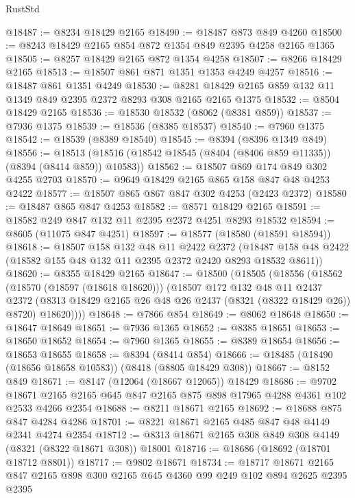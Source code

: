 \begin{lexlean}{RustStd}
\begin{coremodule}
@18487 := @8234 @18429 @2165
@18490 := @18487 @873 @849 @4260
@18500 := @8243 @18429 @2165 @854 @872 @1354 @849 @2395 @4258 @2165 @1365
@18505 := @8257 @18429 @2165 @872 @1354 @4258
@18507 := @8266 @18429 @2165
@18513 := @18507 @861 @871 @1351 @1353 @4249 @4257
@18516 := @18487 @861 @1351 @4249
@18530 := @8281 @18429 @2165 @859 @132 @11 @1349 @849 @2395 @2372 @8293 @308 @2165 @2165 @1375
@18532 := @8504 @18429 @2165
@18536 := @18530 @18532 (@8062 (@8381 @859))
@18537 := @7936 @1375
@18539 := @18536 (@8385 @18537)
@18540 := @7960 @1375
@18542 := @18539 (@8389 @18540)
@18545 := @8394 (@8396 @1349 @849)
@18556 := @18513 (@18516 (@18542 @18545 (@8404 (@8406 @859 @11335)) (@8394 (@8414 @859)) @10583))
@18562 := @18507 @869 @174 @849 @302 @4255 @2703
@18570 := @9649 @18429 @2165 @865 @158 @847 @48 @4253 @2422
@18577 := @18507 @865 @867 @847 @302 @4253 (@2423 @2372)
@18580 := @18487 @865 @847 @4253
@18582 := @8571 @18429 @2165
@18591 := @18582 @249 @847 @132 @11 @2395 @2372 @4251 @8293 @18532
@18594 := @8605 (@11075 @847 @4251)
@18597 := @18577 (@18580 (@18591 @18594))
@18618 := @18507
    @158
    @132
    @48
    @11
    @2422
    @2372
    (@18487 @158 @48 @2422 (@18582 @155 @48 @132 @11 @2395 @2372 @2420 @8293 @18532 @8611))
@18620 := @8355 @18429 @2165
@18647 := @18500
    (@18505
      (@18556
        (@18562
          (@18570 (@18597 (@18618 @18620)))
          (@18507
            @172
            @132
            @48
            @11
            @2437
            @2372
            (@8313 @18429 @2165 @26 @48 @26 @2437 (@8321 (@8322 @18429 @26)) @8720)
            @18620))))
@18648 := @7866 @854
@18649 := @8062 @18648
@18650 := @18647 @18649
@18651 := @7936 @1365
@18652 := @8385 @18651
@18653 := @18650 @18652
@18654 := @7960 @1365
@18655 := @8389 @18654
@18656 := @18653 @18655
@18658 := @8394 (@8414 @854)
@18666 := @18485 (@18490 (@18656 @18658 @10583)) (@8418 (@8805 @18429 @308))
@18667 := @8152 @849
@18671 := @8147 (@12064 (@18667 @12065)) @18429
@18686 := @9702
    @18671
    @2165
    @2165
    @645
    @847
    @2165
    @875
    @898
    @17965
    @4288
    @4361
    @102
    @2533
    @4266
    @2354
@18688 := @8211 @18671 @2165
@18692 := @18688 @875 @847 @4284 @4286
@18701 := @8221 @18671 @2165 @485 @847 @48 @4149 @2341 @4274 @2354
@18712 := @8313 @18671 @2165 @308 @849 @308 @4149 (@8321 (@8322 @18671 @308)) @18001
@18716 := @18686 (@18692 (@18701 @18712 @8801))
@18717 := @9802 @18671
@18734 := @18717
    @18671
    @2165
    @847
    @2165
    @898
    @300
    @2165
    @645
    @4360
    @99
    @249
    @102
    @894
    @2625
    @2395
    @2395

\end{coremodule}
\end{lexlean}
